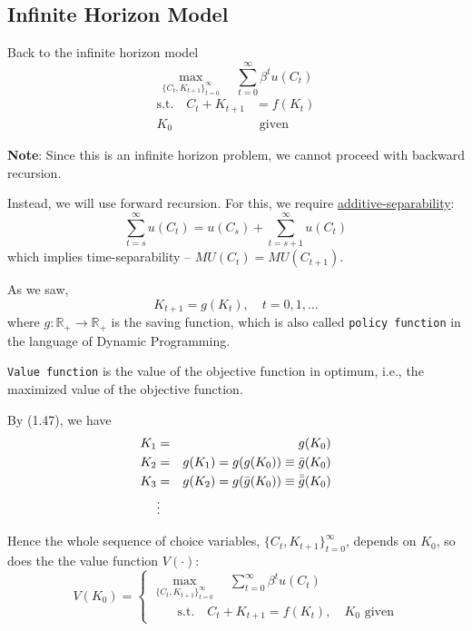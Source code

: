 \documentclass[twoside]{article}
\begin{document}
\subsection{Infinite Horizon Model}
Back to the infinite horizon model
\begin{equation}
  \max_{\{C_t, K_{t+1}\}_{t=0}^\infty} \quad \sum_{t=0}^\infty \beta^t u(C_t)
\end{equation}
\begin{equation}
\begin{aligned}
  \text{s.t.} \quad C_t + K_{t+1} &= f(K_t) \\
  K_0 & \text{~given}
\end{aligned}
\end{equation}

{\bf Note}: Since  this is an infinite horizon problem, we cannot proceed with backward recursion. 

Instead, we will use forward recursion. For this, we require \underline{additive-separability}:
\begin{equation}
  \sum_{t=s}^\infty u(C_t) = u(C_s) + \sum_{t=s+1}^\infty u(C_t) 
\end{equation}
which implies time-separability -- $MU(C_t) = MU(C_{t+1})$.

As we saw, 
\begin{equation}
  K_{t+1} = g(K_t), \quad t = 0, 1, \dots
\end{equation}
where $g : \mathbb{R}_+ \longrightarrow \mathbb{R}_+$ is the saving function, which is also called \texttt{policy function} in the language of Dynamic Programming.

\texttt{Value function} is the value of the objective function in optimum, i.e., the maximized value of the objective function.

By (1.47), we have 
\begin{eqnarray}
  K_1 &=& g(K_0)\\
  K_2 &=& g(K_1) = g(g(K_0)) \equiv \bar{g}(K_0)\\
  K_3 &=& g(K_2) = g(\bar{g}(K_0)) \equiv \bar{\bar{g}}(K_0)\\
  &\vdots& \notag
\end{eqnarray}

Hence the whole sequence of choice variables, ${\{C_t, K_{t+1}\}_{t=0}^\infty}$, depends on $K_0$, so does the the value function $V(\cdot)$:
\begin{equation}
  V(K_0) = \begin{cases}
  \max\limits_{\{C_t, K_{t+1}\}_{t=0}^\infty} \quad \sum_{t=0}^\infty \beta^t u(C_t)\\%
  \qquad \text{s.t.} \quad C_t + K_{t+1} = f(K_t), \quad K_0  \text{~given}
  \end{cases}
\end{equation}
\end{document}
